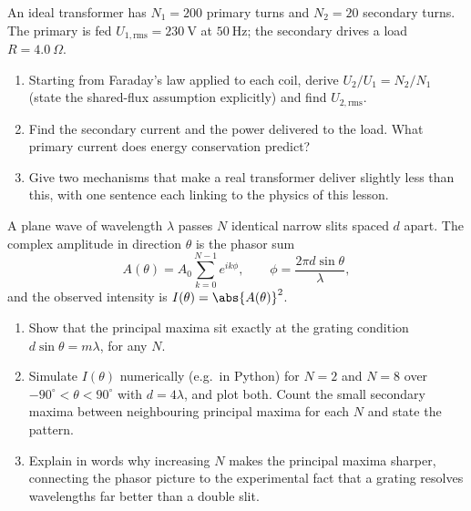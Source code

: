 \begin{exercise}\label{ex:em-15}
An ideal transformer has $N_1 = 200$ primary turns and $N_2 = 20$ secondary turns. The primary is fed $U_{1,\text{rms}} = 230\ \mathrm{V}$ at $50\ \mathrm{Hz}$; the secondary drives a load $R = 4.0\ \Omega$.
\begin{enumerate}[label=(\alph*)]
  \item Starting from Faraday's law applied to each coil, derive $U_2/U_1 = N_2/N_1$ (state the shared-flux assumption explicitly) and find $U_{2,\text{rms}}$.
  \item Find the secondary current and the power delivered to the load. What primary current does energy conservation predict?
  \item Give two mechanisms that make a real transformer deliver slightly less than this, with one sentence each linking to the physics of this lesson.
\end{enumerate}
\end{exercise}

\begin{exercise}\label{ex:em-16}
A plane wave of wavelength $\lambda$ passes $N$ identical narrow slits spaced $d$ apart. The complex amplitude in direction $\theta$ is the phasor sum
\[
  A(\theta) = A_0\sum_{k=0}^{N-1} e^{ik\phi}, \qquad \phi = \frac{2\pi d\sin\theta}{\lambda},
\]
and the observed intensity is $I(\theta) = \abs{A(\theta)}^2$.
\begin{enumerate}[label=(\alph*)]
  \item Show that the principal maxima sit exactly at the grating condition $d\sin\theta = m\lambda$, for any $N$.
  \item Simulate $I(\theta)$ numerically (e.g.\ in Python) for $N = 2$ and $N = 8$ over $-90^\circ < \theta < 90^\circ$ with $d = 4\lambda$, and plot both. Count the small secondary maxima between neighbouring principal maxima for each $N$ and state the pattern.
  \item Explain in words why increasing $N$ makes the principal maxima sharper, connecting the phasor picture to the experimental fact that a grating resolves wavelengths far better than a double slit.
\end{enumerate}
\end{exercise}
